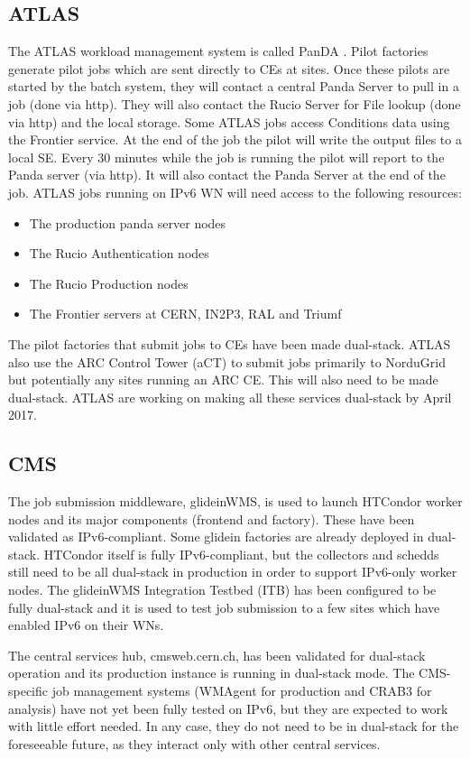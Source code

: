 \documentclass[a4paper]{jpconf}
\begin{document}
\subsection{ATLAS}
The ATLAS workload management system is called PanDA \cite{Panda}.
Pilot factories generate pilot jobs which are sent directly to CEs at
sites. Once these pilots are started by the batch system, they will
contact a central Panda Server to pull in a job (done via http). They
will also contact the Rucio Server for File lookup (done via http) and
the local storage. Some ATLAS jobs access Conditions data using the
Frontier service. At the end of the job the pilot will write the
output files to a local SE. Every 30 minutes while the job is running
the pilot will report to the Panda server (via http). It will also
contact the Panda Server at the end of the job. ATLAS jobs running on
IPv6 WN will need access to the following resources:
\begin{itemize}
\item The production panda server nodes
\item The Rucio Authentication nodes
\item The Rucio Production nodes
\item The Frontier servers at CERN, IN2P3, RAL and Triumf
\end{itemize}  
The pilot factories that submit jobs to CEs have been made dual-stack.
ATLAS also use the ARC Control Tower (aCT) to submit jobs primarily to
NorduGrid but potentially any sites running an ARC CE. This will also
need to be made dual-stack. ATLAS are working on making all these
services dual-stack by April 2017.

\subsection{CMS}
The job submission middleware, glideinWMS, is used to launch HTCondor
worker nodes and its major components (frontend and factory). These
have been validated as IPv6-compliant. Some glidein factories are
already deployed in dual-stack. HTCondor itself is fully
IPv6-compliant, but the collectors and schedds still need to be all
dual-stack in production in order to support IPv6-only worker nodes.
The glideinWMS Integration Testbed (ITB) has been configured to be fully
dual-stack and it is used to test job submission to a few sites which
have enabled IPv6 on their WNs.

The central services hub, cmsweb.cern.ch, has been validated for
dual-stack operation and its production instance is running in
dual-stack mode. The CMS-specific job management systems (WMAgent for
production and CRAB3 for analysis) have not yet been fully tested on
IPv6, but they are expected to work with little effort needed. In any
case, they do not need to be in dual-stack for the foreseeable future,
as they interact only with other central services.
\end{document}
